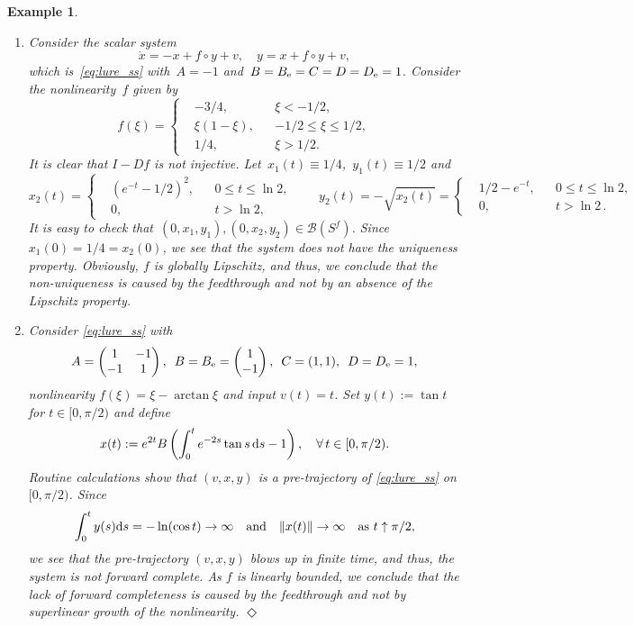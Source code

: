 \documentclass[a4paper,11pt]{article}
\newcommand{\sB}{{\mathcal B}}
\numberwithin{equation}{section}
\numberwithin{figure}{section}
\numberwithin{table}{section}
\newtheorem{example}[theorem]{Example}
\begin{document}
\begin{example}
\begin{rm}
\begin{enumerate}[label = {\bf (\alph*)}, ref={\rm (\alph*)}, leftmargin = 0ex, itemindent = 4.6ex]
\[\]
we conclude that~$(0,x,y)$ is a maximally defined pre-trajectory satisfying
$x(0)=(1/2,0)^\top$. It is clear that
\[
\limsup_{t\to\ln 2}\|x(t)\|+\int_0^{\ln 2}(|y(s)|+|f(y(s))|)\, {\rm d}s <\infty,
\]
showing that the system does not have the blow-up property.
%
\item\label{ls:ivp_ex_c}
Consider the scalar system
\[
\dot x=-x+f\circ y+v,\quad y=x+f\circ y+v,
\]
which is~\eqref{eq:lure_ss} with~$A=-1$ and~$B=B_{\rm e}=C=D=D_{\rm e}=1$. Consider the nonlinearity~$f$ given by
\[
f(\xi)=\left\{ \begin{aligned} & -3/4, & & \xi<-1/2, \\
& \xi(1-\xi), & &-1/2\leq \xi\leq 1/2, \\
& 1/4, & & \xi>1/2.
\end{aligned}\right.
\]
It is clear that $I-Df$ is not injective. Let~$x_1(t)\equiv 1/4$,~$y_1(t)\equiv 1/2$ and
\[
x_2(t)=\left\{ \begin{aligned} & (e^{-t}-1/2)^2, & & 0\leq t\leq\ln 2, \\
& 0, & & t>\ln 2, \end{aligned} \right.\qquad
y_2(t)=-\sqrt{x_2(t)}=\left\{ \begin{aligned} & 1/2-e^{-t}, & & 0\leq t\leq\ln 2, \\
& 0, & & t>\ln 2\,. \end{aligned} \right.
\]
It is easy to check that~$(0,x_1,y_1), (0,x_2,y_2)\in\sB(S^f)$. Since $x_1(0)=1/4=
x_2(0)$, we see that the system does not have the uniqueness property. Obviously, $f$ is globally Lipschitz, and thus, we conclude that the non-uniqueness is caused by the feedthrough and not by an absence of the Lipschitz property.
%
\item\label{ls:ivp_ex_d}
Consider \eqref{eq:lure_ss} with
\[
A=\begin{pmatrix} 1 & -1\\ -1 & 1\end{pmatrix},\,\,\,
B=B_{\rm e}=\begin{pmatrix} 1 \\ -1 \end{pmatrix},\,\,\, C=(1,1),\,\,\,D=D_{\rm e}=1,
\]
nonlinearity $f(\xi)=\xi-\arctan\xi$ and input $v(t)=t$. Set
$y(t):=\tan t$ for $t\in[0,\pi/2)$ and define
\[
x(t):=e^{2t}B\left(\int_0^te^{-2s}\tan s\,{\rm d}s-1\right),\quad\forall\,t\in[0,\pi/2).
\]
Routine calculations show that $(v,x,y)$ is a pre-trajectory of \eqref{eq:lure_ss} on $[0,\pi/2)$.
Since
\[
\int_0^t y(s){\rm d}s=-\ln(\cos t)\to\infty\quad\mbox{and}\quad \|x(t)\|\to\infty
\quad\mbox{as $t\uparrow\pi/2$},
\]
we see that the pre-trajectory $(v,x,y)$ blows up in finite time, and thus, the system is not forward complete. As $f$ is linearly bounded, we conclude that the lack of forward completeness is caused by the feedthrough and not by superlinear growth of the nonlinearity.
\hfill$\Diamond$
\end{enumerate}
\end{rm}
\end{example}
%
\end{document}
